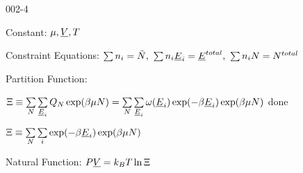 \begin{mitframe}{002-4} %

    
\begin{listone}
    
    \item Constant: $\chempot, \uline{\vol}, \Temp$

    \item Constraint Equations: $\sum\nolimits \molspecies{i} = \totmoles, ~\sum\nolimits \molspecies{i}\uline{\energy}_{i} = \uline{\energy}^{total},~\sum\nolimits \molspecies{i}\nummoles = \nummoles^{total}  $     %
    
    \item Partition Function:
    
    \begin{listtwo}
        
    	\item $\gcpf \equiv \sum\limits_{\nummoles}\sum\limits_{\uline{\energy}_{i}} \cpf\exp(\boltznorm\chempot\nummoles) = \sum\limits_{\nummoles}\sum\limits_{\uline{\energy}_{i}} \mpf(\uline{\energy}_{i})\exp(-\boltznorm\uline{\energy}_{i})\exp(\boltznorm\chempot\nummoles) $
    done
    	\item $\gcpf \equiv \sum\limits_{\nummoles}\sum\limits_{i} \exp(-\boltznorm\uline{\energy}_{i})\exp(\boltznorm\chempot\nummoles) $
    
    \end{listtwo}
    
    \medskip       
    
    \item Natural Function: $\p\uline{\vol} = \boltz\Temp\ln\gcpf$
    
    
\end{listone}
    
\end{mitframe}